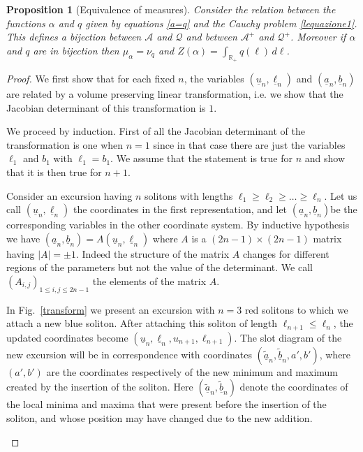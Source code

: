 \documentclass[12pt]{article}
\numberwithin{equation}{section}
\newtheorem{proposition}[theorem]{Proposition}
\newcommand{\RR}{\mathbb R}
\begin{document}
\begin{proposition}[Equivalence of measures]
	\label{eqm9}
	Consider the relation  between the functions $\alpha$ and $q$ given by equations \eqref{a=q} and the Cauchy problem \eqref{lequazione1}.
	This defines a bijection between $\mathcal A$ and $\mathscr Q$ and between $\mathcal A^+$ and $\mathscr Q^+$. Moreover if $\alpha$ and $q$ are in bijection then 
	$ \mu_\alpha=\nu_q$ and $Z(\alpha)=\int_{\RR_+} q(\ell)\, d\ell$.
\end{proposition}
\begin{proof}
	
	
	We first show that for each fixed $n$,
the variables $(\underline u_n,\underline \ell_n)$ and $(\underline a_n,\underline b_n)$
are related by a volume preserving linear transformation, i.e. we show that the Jacobian determinant of this transformation is $1$. 

We proceed by induction. First of all the Jacobian determinant of the transformation is one when $n=1$ since in that case there are just the variables $\ell_1$ and $b_1$ with $\ell_1=b_1$. We assume that the statement is true for $n$ and show that it is then true for $n+1$. 

Consider an excursion having $n$ solitons with lengths $\ell_1\geq \ell_2\geq \dots \geq \ell_{n}$. Let us call $(\underline u_n,\underline \ell_n)$ the coordinates in the first representation, and let $(\underline a_n, \underline b_n)$be  the corresponding variables in the other coordinate system. By inductive hypothesis we have
$(\underline a_n, \underline b_n)=A(\underline u_n, \underline \ell_n)$ where $A$ is a $(2n-1)\times (2n-1)$ matrix 
having $|A|=\pm 1$. Indeed the structure of the matrix $A$ changes for different regions of the parameters but not the value of the determinant.
We call $(A_{i,j})_{1\leq i,j\leq 2n-1}$ the elements of the matrix $A$.

In Fig.~\ref{transform} we present an excursion with $n=3$ red solitons to which we attach a new blue soliton. After attaching this soliton of length $\ell_{n+1}\leq \ell_n$, the updated coordinates become
$(\underline u_n, \underline \ell_n, u_{n+1}, \ell_{n+1})$. 
The slot diagram of the new excursion will be in correspondence with coordinates $(\tilde{\underline a}_n, \tilde{\underline b}_n, a', b')$, where $(a',b')$ are the coordinates respectively of the new minimum and maximum created by the insertion of the soliton. Here $(\tilde{\underline a}_n,\tilde{\underline b}_n)$ denote the coordinates of the local minima and maxima that were present before the insertion of the soliton, and whose position may have changed due to the new addition. 
\begin{figure}
	

\end{figure}
\end{proof}
\end{document}
